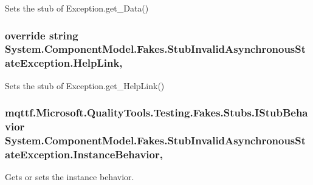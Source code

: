 Sets the stub of Exception.\-get\-\_\-\-Data()

\hypertarget{class_system_1_1_component_model_1_1_fakes_1_1_stub_invalid_asynchronous_state_exception_ab78e0152e61c837058f32785ced766a2}{
\subsubsection[{Help\-Link}]{\setlength{\rightskip}{0pt plus 5cm}override string System.\-Component\-Model.\-Fakes.\-Stub\-Invalid\-Asynchronous\-State\-Exception.\-Help\-Link\hspace{0.3cm}{\ttfamily [get]}, {\ttfamily [set]}}}\label{class_system_1_1_component_model_1_1_fakes_1_1_stub_invalid_asynchronous_state_exception_ab78e0152e61c837058f32785ced766a2}


Sets the stub of Exception.\-get\-\_\-\-Help\-Link()

\hypertarget{class_system_1_1_component_model_1_1_fakes_1_1_stub_invalid_asynchronous_state_exception_a857cd29db011c7b5de0d8273d1ee3e5f}{
\subsubsection[{Instance\-Behavior}]{\setlength{\rightskip}{0pt plus 5cm}mqttf.\-Microsoft.\-Quality\-Tools.\-Testing.\-Fakes.\-Stubs.\-I\-Stub\-Behavior System.\-Component\-Model.\-Fakes.\-Stub\-Invalid\-Asynchronous\-State\-Exception.\-Instance\-Behavior\hspace{0.3cm}{\ttfamily [get]}, {\ttfamily [set]}}}\label{class_system_1_1_component_model_1_1_fakes_1_1_stub_invalid_asynchronous_state_exception_a857cd29db011c7b5de0d8273d1ee3e5f}


Gets or sets the instance behavior.

